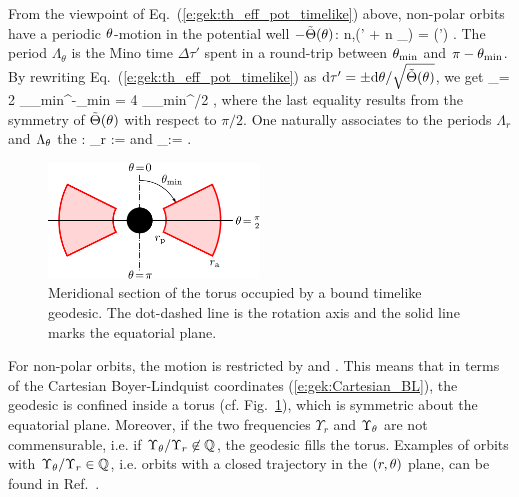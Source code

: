 From the viewpoint of Eq.~(\ref{e:gek:th_eff_pot_timelike}) above,
non-polar orbits have a periodic $\theta$-motion in the potential well $-\tilde{\Theta}(\theta)$:
\be
    \forall n\in{},\quad \th(\tau' + n \Lambda_\th) = \th(\tau') .
\ee
The period
$\Lambda_\theta$ is the Mino time $\Delta\tau'$ spent in a round-trip
between $\theta_{\rm min}$ and $\pi-\theta_{\rm min}$.
By rewriting Eq.~(\ref{e:gek:th_eff_pot_timelike})
as $\mathrm{d}\tau' = \pm \mathrm{d} \theta / \sqrt{\tilde\Theta(\theta)}$, we get
\be
    \Lambda_\th = 2 \int_{\th_{\rm min}}^{\pi-\th_{\rm min}}
              \frac{\D \th}{\sqrt{\tilde\Theta(\th)}}
              = 4 \int_{\th_{\rm min}}^{\pi/2}
                  \frac{\D \th}{\sqrt{\tilde\Theta(\th)}} ,
\ee
where the last equality results from the symmetry of $\tilde\Theta(\theta)$
with respect to $\pi/2$.
One naturally associates to the periods $\Lambda_r$ and $\Lambda_\theta$
the :
\be
    \Upsilon_r :=  \qquad\mbox{and}\qquad
    \Upsilon_\th := \frac{2\pi}{\Lambda_\th} .
\ee

\begin{figure}
\centerline{\includegraphics[width=0.5\textwidth]{gek_torus.pdf}}
\caption[]{\label{f:gek:torus} \footnotesize
Meridional section of the torus occupied by a bound timelike geodesic. The dot-dashed line
is the rotation axis and the solid line marks the equatorial plane.
}
\end{figure}

For non-polar orbits, the motion is restricted by
\be
  \qquad\mbox{and}\qquad
 .
\ee
This means that in terms of the Cartesian Boyer-Lindquist coordinates (\ref{e:gek:Cartesian_BL}), the
geodesic is confined inside a torus (cf. Fig.~\ref{f:gek:torus}), which is
symmetric about the equatorial plane. Moreover, if the two frequencies
$\Upsilon_r$ and $\Upsilon_\theta$ are not commensurable, i.e. if
$\Upsilon_\theta / \Upsilon_r \not\in\mathbb{Q}$, the geodesic fills the torus.
Examples of orbits with $\Upsilon_\theta / \Upsilon_r \in\mathbb{Q}$, i.e.
orbits with a closed trajectory in the $(r,\theta)$ plane, can be
found in Ref.~\cite{GrossLP12}.

